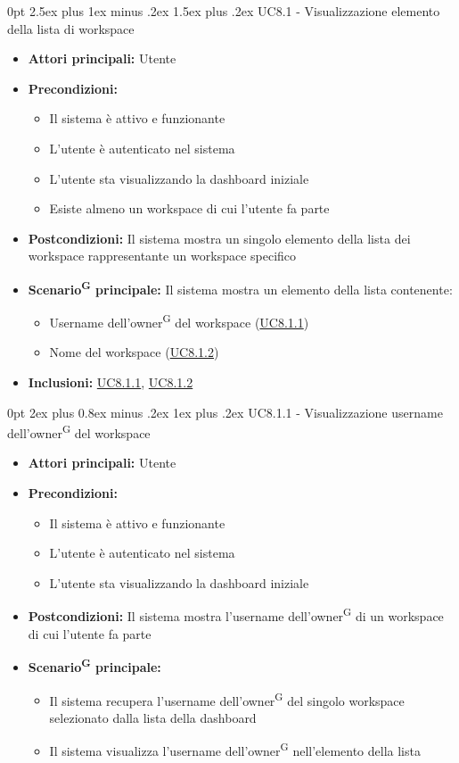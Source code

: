 \documentclass[a4paper, 11pt]{article}
\makeatletter
\renewcommand\paragraph{\@startsection{paragraph}{4}
  {0pt}
  {2.5ex plus 1ex minus .2ex}
  {1.5ex plus .2ex}
  {\normalfont\normalsize\bfseries\color{AccentDark}}}
\renewcommand\subparagraph{\@startsection{subparagraph}{5}
  {0pt}
  {2ex plus 0.8ex minus .2ex}
  {1ex plus .2ex}
  {\normalfont\normalsize\bfseries\color{AccentColor}}}
\makeatother
\begin{document}
\paragraph{UC8.1 - Visualizzazione elemento della lista di workspace}\label{UC8.1}
\begin{itemize}
	\item \textbf{Attori principali:} Utente
	\item \textbf{Precondizioni:}
	\begin{itemize}
		\item Il sistema è attivo e funzionante
		\item L'utente è autenticato nel sistema
        \item L'utente sta visualizzando la dashboard iniziale
        \item Esiste almeno un workspace di cui l'utente fa parte
	\end{itemize}
    \item \textbf{Postcondizioni:} Il sistema mostra un singolo elemento della lista dei workspace rappresentante un workspace specifico
	\item \textbf{Scenario\textsuperscript{G} principale:} Il sistema mostra un elemento della lista contenente:
    \begin{itemize}
        \item Username dell'owner\textsuperscript{G} del workspace (\hyperref[UC8.1.1]{UC8.1.1})
        \item Nome del workspace (\hyperref[UC8.1.2]{UC8.1.2})
    \end{itemize}
    \item \textbf{Inclusioni:} \hyperref[UC8.1.1]{UC8.1.1}, \hyperref[UC8.1.2]{UC8.1.2}
\end{itemize}

\subparagraph{UC8.1.1 - Visualizzazione username dell'owner\textsuperscript{G} del workspace}\label{UC8.1.1}
\begin{itemize}
	\item \textbf{Attori principali:} Utente
	\item \textbf{Precondizioni:}
	\begin{itemize}
		\item Il sistema è attivo e funzionante
		\item L'utente è autenticato nel sistema
        \item L'utente sta visualizzando la dashboard iniziale
	\end{itemize}
    \item \textbf{Postcondizioni:} Il sistema mostra l'username dell'owner\textsuperscript{G} di un workspace di cui l'utente fa parte
	\item \textbf{Scenario\textsuperscript{G} principale:}
    \begin{itemize}
        \item Il sistema recupera l'username dell'owner\textsuperscript{G} del singolo workspace selezionato dalla lista della dashboard
        \item Il sistema visualizza l'username dell'owner\textsuperscript{G} nell'elemento della lista
    \end{itemize}
\end{itemize}
\end{document}
